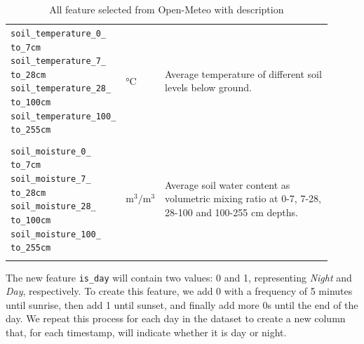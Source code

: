 \begin{longtable}[c]{p{0.3\linewidth}|p{0.07\linewidth}| p{0.54\linewidth}}
	\verb|soil_temperature_0_| \verb|   to_7cm| \verb|soil_temperature_7_| \verb|   to_28cm| \verb|soil_temperature_28_| \verb|   to_100cm| \verb|soil_temperature_100_| \verb|   to_255cm| & °C                      & Average temperature of different soil levels below ground.                                                                                                                                                                                                                                             \\
	                                                                                                                                                                                        &                         &                                                                                                                                                                                                                                                                                                        \\
	\verb|soil_moisture_0_| \verb|   to_7cm| \verb|soil_moisture_7_| \verb|   to_28cm| \verb|soil_moisture_28_| \verb|   to_100cm| \verb|soil_moisture_100_| \verb|   to_255cm|             & $\text{m}^3/\text{m}^3$ & Average soil water content as volumetric mixing ratio at 0-7, 7-28, 28-100 and 100-255 cm depths.                                                                                                                                                                                                      \\
	\caption{All feature selected from Open-Meteo with description}\label{tab:openmeteofeatures}
\end{longtable}

The new feature \texttt{is\_day} will contain two values: 0 and 1,
representing \textit{Night} and \textit{Day}, respectively.
To create this feature, we add 0 with a frequency of 5 minutes until sunrise,
then add 1 until sunset, and finally add more 0s until the end of the day.
We repeat this process for each day in the dataset to create a new column that,
for each timestamp, will indicate whether it is day or night.


